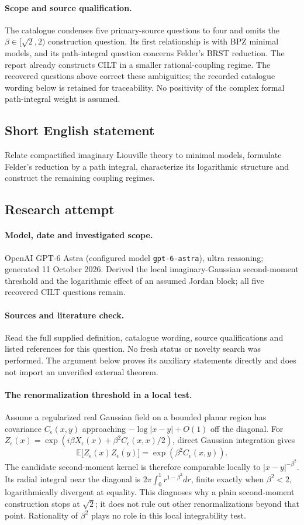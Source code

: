 \documentclass[11pt]{article}
\begin{document}
\paragraph{Scope and source qualification.}The catalogue condenses five primary-source questions to four and omits the $\beta\in[\sqrt2,2)$ construction question. Its first relationship is with BPZ minimal models, and its path-integral question concerns Felder's BRST reduction. The report already constructs CILT in a smaller rational-coupling regime. The recovered questions above correct these ambiguities; the recorded catalogue wording below is retained for traceability. No positivity of the complex formal path-integral weight is assumed.
\subsection{Short English statement}
Relate compactified imaginary Liouville theory to minimal models, formulate Felder's reduction by a path integral, characterize its logarithmic structure and construct the remaining coupling regimes.
\subsection{Research attempt}
\paragraph{Model, date and investigated scope.}
OpenAI GPT-6 Astra (configured model \texttt{gpt-6-astra}), ultra reasoning; generated 11 October 2026. Derived the local imaginary-Gaussian second-moment threshold and the logarithmic effect of an assumed Jordan block; all five recovered CILT questions remain.

\paragraph{Sources and literature check.}
Read the full supplied definition, catalogue wording, source qualifications and listed references for this question. No fresh status or novelty search was performed. The argument below proves its auxiliary statements directly and does not import an unverified external theorem.

\paragraph{The renormalization threshold in a local test.} Assume a regularized real Gaussian field on a bounded planar region has covariance \(C_\epsilon(x,y)\) approaching \(-\log|x-y|+O(1)\) off the diagonal. For \(Z_\epsilon(x)=\exp(i\beta X_\epsilon(x)+\beta^2C_\epsilon(x,x)/2)\), direct Gaussian integration gives
\[
 \mathbb E\bigl[Z_\epsilon(x)\overline{Z_\epsilon(y)}\bigr]
 =\exp(\beta^2 C_\epsilon(x,y)).
\]
The candidate second-moment kernel is therefore comparable locally to \(|x-y|^{-\beta^2}\). Its radial integral near the diagonal is \(2\pi\int_0^1r^{1-\beta^2}dr\), finite exactly when \(\beta^2<2\), logarithmically divergent at equality. This diagnoses why a plain second-moment construction stops at \(\sqrt2\); it does not rule out other renormalizations beyond that point. Rationality of \(\beta^2\) plays no role in this local integrability test.
\end{document}

